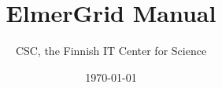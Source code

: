 \documentclass[a4paper,english]{report}    %
\title{\Huge{\bf ElmerGrid Manual}}
\author{CSC, the Finnish IT Center for Science}
\date{\today}
\begin{document}
\maketitle






\setcounter{secnumdepth}{2}
\setcounter{tocdepth}{1}  %

\tableofcontents


\newpage


\graphicspath{{./}{figures/}}


\graphicspath{{./}{figures/}}


\graphicspath{{./}{figures/}}


\graphicspath{{./}{tool/}}


\graphicspath{{./}{import/}}






\printindex
\end{document}
